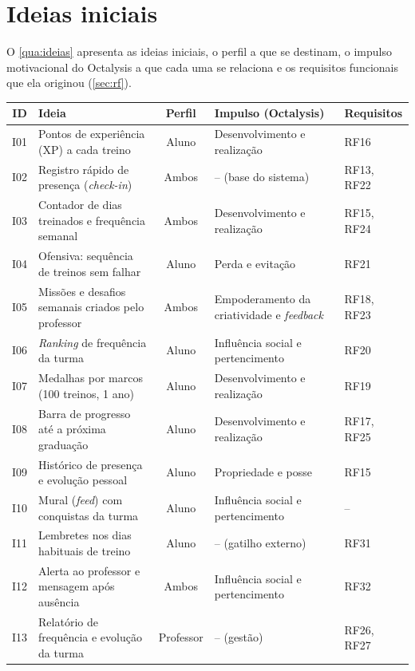 \section{Ideias iniciais}
\label{sec:ideias}

O \autoref{qua:ideias} apresenta as ideias iniciais, o perfil a que se
destinam, o impulso motivacional do Octalysis \cite{chou2015} a que cada
uma se relaciona e os requisitos funcionais que ela originou
(\autoref{sec:rf}).

\begin{quadro}[!htb]
  \caption{Ideias iniciais de funcionalidades}
  \label{qua:ideias}
  \centering
  \footnotesize
  \begin{tabular}{|c|p{4.6cm}|c|p{3.9cm}|p{2.0cm}|}
    \hline
    \textbf{ID} & \textbf{Ideia} & \textbf{Perfil} & \textbf{Impulso (Octalysis)} & \textbf{Requisitos} \\ \hline
    I01 & Pontos de experiência (XP) a cada treino & Aluno & Desenvolvimento e realização & RF16 \\ \hline
    I02 & Registro rápido de presença (\textit{check-in}) & Ambos & -- (base do sistema) & RF13, RF22 \\ \hline
    I03 & Contador de dias treinados e frequência semanal & Ambos & Desenvolvimento e realização & RF15, RF24 \\ \hline
    I04 & Ofensiva: sequência de treinos sem falhar & Aluno & Perda e evitação & RF21 \\ \hline
    I05 & Missões e desafios semanais criados pelo professor & Ambos & Empoderamento da criatividade e \textit{feedback} & RF18, RF23 \\ \hline
    I06 & \textit{Ranking} de frequência da turma & Aluno & Influência social e pertencimento & RF20 \\ \hline
    I07 & Medalhas por marcos (100 treinos, 1 ano) & Aluno & Desenvolvimento e realização & RF19 \\ \hline
    I08 & Barra de progresso até a próxima graduação & Aluno & Desenvolvimento e realização & RF17, RF25 \\ \hline
    I09 & Histórico de presença e evolução pessoal & Aluno & Propriedade e posse & RF15 \\ \hline
    I10 & Mural (\textit{feed}) com conquistas da turma & Aluno & Influência social e pertencimento & -- \\ \hline
    I11 & Lembretes nos dias habituais de treino & Aluno & -- (gatilho externo) & RF31 \\ \hline
    I12 & Alerta ao professor e mensagem após ausência & Ambos & Influência social e pertencimento & RF32 \\ \hline
    I13 & Relatório de frequência e evolução da turma & Professor & -- (gestão) & RF26, RF27 \\ \hline
  \end{tabular}
\end{quadro}

